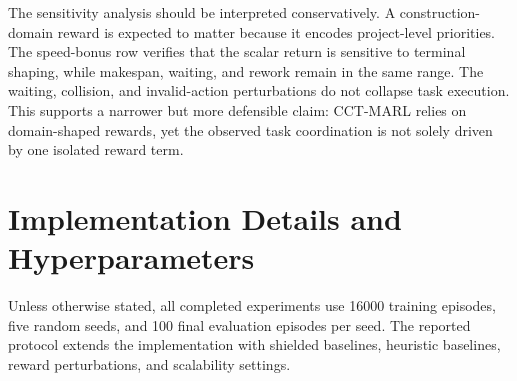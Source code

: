 \documentclass[fleqn,10pt]{wlpeerj}
\begin{document}
\begin{table}[htbp]
\centering
\caption{Reward-sensitivity results used for attribution analysis. Collision remains zero under shielded execution.}
\label{tab:reward_sensitivity_appendix}
\end{table}

The sensitivity analysis should be interpreted conservatively. A construction-domain reward is expected to matter because it encodes project-level priorities. The speed-bonus row verifies that the scalar return is sensitive to terminal shaping, while makespan, waiting, and rework remain in the same range. The waiting, collision, and invalid-action perturbations do not collapse task execution. This supports a narrower but more defensible claim: CCT-MARL relies on domain-shaped rewards, yet the observed task coordination is not solely driven by one isolated reward term.

\section{Implementation Details and Hyperparameters}
\label{app:implementation}

Unless otherwise stated, all completed experiments use 16000 training episodes, five random seeds, and 100 final evaluation episodes per seed. The reported protocol extends the implementation with shielded baselines, heuristic baselines, reward perturbations, and scalability settings.
\end{document}
